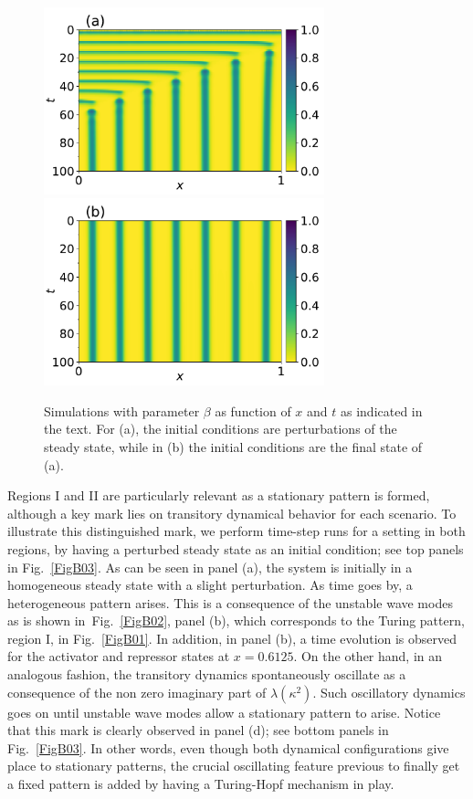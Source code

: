 \documentclass[11pt]{article}
\begin{document}
	\begin{figure}%
		\centering
		\includegraphics[width=3.2in]{Figures/ApFigure04a}
		\includegraphics[width=3.2in]{Figures/ApFigure04b}
		\caption{Simulations with parameter $\beta$ as function of $x$ and $t$ as indicated in the text. For (a), the initial conditions are perturbations of the steady state,
		while in (b) the initial conditions are the final state of (a).}
		\label{FigB04}
	\end{figure}

Regions I and II are particularly relevant as a stationary pattern is formed, although a key mark lies on transitory dynamical behavior for each scenario. To illustrate this distinguished mark, we perform time-step runs for a setting in both regions, by having a perturbed steady state as an initial condition; see top panels in Fig.~\ref{FigB03}. As can be seen in panel (a), the system is initially in a homogeneous steady state with a slight perturbation. As time goes by, a heterogeneous pattern arises. This is a consequence of the unstable wave modes as is shown in~Fig.~\ref{FigB02}, panel (b), which corresponds to the Turing pattern, region I, in Fig.~\ref{FigB01}. In addition, in panel (b), a time evolution is observed for the activator and repressor states at $x=0.6125$. On the other hand, in an analogous fashion, the transitory dynamics spontaneously oscillate as a consequence of the non zero imaginary part of $\lambda(\kappa^2)$. Such oscillatory dynamics goes on until unstable wave modes allow a stationary pattern to arise. Notice that this mark is clearly observed in panel (d); see bottom panels in Fig.~\ref{FigB03}. In other words, even though both dynamical configurations give place to stationary patterns, the crucial oscillating feature previous to finally get a fixed pattern is added by having a Turing-Hopf mechanism in play.
	
\end{document}
